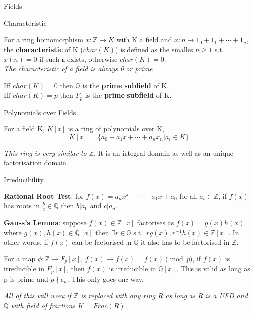\documentclass[12pt, letterpaper]{article}
\newcommand{\Q}{\mathbb{Q}}
\newcommand{\Z}{\mathbb{Z}}
\begin{document}
\begin{section}{Fields}

  \begin{subsection}{Characteristic}

    For a ring homomorphism \(x: \Z \to K\) with K a field and
    \(x: n \to 1_{0} + 1_{1} + \cdots + 1_{n}\), the  \textbf{characteristic}
    of K (\(char(K)\)) is defined as the smalles \(n \geq 1\) s.t. \(x(n) = 0\)
    if such n exists, otherwise \(char(K) = 0\). \\
    \textit{The characteristic of a field is always 0 or prime}

    Iff \(char(K) = 0\) then \(\Q\) is the \textbf{prime subfield} of
    K. \\
    Iff \(char(K) = p\) then \(F_{p}\) is the \textbf{prime subfield} of K.

  \end{subsection}

  \begin{subsection}{Polynomials over Fields}

    For a field K, \(K[x]\) is a ring of polynomials over K,
    \[K[x] = \{a_{0} + a_{1}x + \cdots + a_{n}x_{n} | a_{i} \in K\}{}\]

    \textit{This ring is very similar to \(\Z\)}. It is an integral
    domain as well as an unique factorisation domain.

    \begin{subsubsection}{Irreducibility}

      \textbf{Rational Root Test}: for \(f(x) = a_{n}x^{n} + \cdots + a_{1}x
      + a_{0}\) for all \(a_{i} \in \Z\), if \(f(x)\) has roots in
      \(\frac{b}{c} \in \Q\) then \(b | a_{0}\) and \(c | a_{n}\).

      \textbf{Gauss's Lemma}: suppose \(f(x) \in \Z[x]\) factorises as
      \(f(x) = g(x)h(x)\) where \(g(x), h(x) \in \Q[x]\) then \(\exists r
      \in \Q\) s.t.\ \(rg(x), r^{-1}h(x) \in \Z[x]\). In other
      words, if \(f(x)\) can be factorised in \(\Q\) it also has to be
      factorised in \(\Z\).

      For a map \(\phi: \Z \to F_{p}[x]\), \(f(x) \to \bar{f}(x) =
      f(x) \pmod{p}\), if \(\bar{f}(x)\) is irreducible in \(F_{p}[x]\), then
      \(f(x)\) is irreducible in \(\Q[x]\). This is valid as long as
      p is prime and \(p \nmid a_{n}\). This only goes one way.

      \textit{All of this will work if \(\Z\) is replaced with any ring
        R as long as R is a UFD and \(\Q\) with field of fractions
        \(K = Frac(R)\).}


\end{subsubsection}
\end{subsection}
\end{section}
\end{document}
